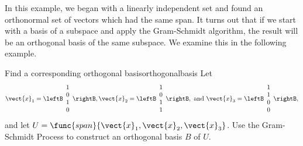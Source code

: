 In this example, we began with a linearly independent set and found an orthonormal set of vectors which had the same span. It turns out that if we start with a basis of a subspace and apply the Gram-Schmidt algorithm, the result will be an orthogonal basis of the same subspace. We examine this in the following example. 

\begin{example}{Find a corresponding orthogonal basis}{orthogonalbasis}
Let
\[ \vect{x}_1=\leftB\begin{array}{c} 1\\ 0\\ 1\\ 0 \end{array}\rightB,
\vect{x}_2=\leftB\begin{array}{c} 1\\ 0\\ 1\\ 1 \end{array}\rightB,
\mbox{ and }
\vect{x}_3=\leftB\begin{array}{c} 1\\ 1\\ 0\\ 0 \end{array}\rightB,\]
and let $U=\func{span}\{\vect{x}_1, \vect{x}_2,\vect{x}_3\}$. Use the Gram-Schmidt Process
to construct an orthogonal basis $B$ of $U$. 
\end{example}

